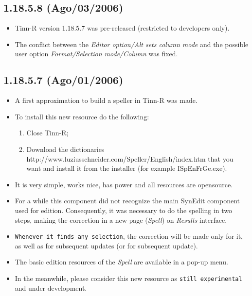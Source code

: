 \subsection*{1.18.5.8 (Ago/03/2006)}
\begin{itemize}
  \item Tinn-R version 1.18.5.7 was pre-released (restricted to developers
    only).
  \item The conflict between the \textit{Editor option/Alt sets column mode}
    and the possible user option \textit{Format/Selection mode/Column}
    was fixed.
\end{itemize}


\subsection*{1.18.5.7 (Ago/01/2006)}
\begin{itemize}
  \item A first approximation to build a speller in Tinn-R was made.
  \item To install this new resource do the following:
    \begin{enumerate}
      \item Close Tinn-R;
      \item Download the dictionaries\\
        {http://www.luziusschneider.com/Speller/English/index.htm}
        that you want and install it from the installer (for
        example ISpEnFrGe.exe).
    \end{enumerate}
  \item It is very simple, works nice, has power and all resources are
    opensource.
  \item For a while this component did not recognize the main SynEdit
    component used for edition. Consequently, it was necessary to do the spelling
    in two steps, making the correction in a new page (\textit{Spell})
    on \textit{Results} interface.
  \item \texttt{Whenever it finds any selection}, the correction will be
    made only for it, as well as for subsequent updates (or for subsequent update).
  \item The basic edition resources of the \textit{Spell} are available
    in a pop-up menu.
  \item In the meanwhile, please consider this new resource as \texttt{still
      experimental} and under development.
\end{itemize}


